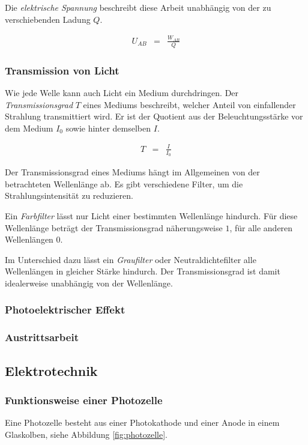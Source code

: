 \documentclass[12pt,a4paper]{scrartcl}
\numberwithin{equation}{section} %
\begin{document}
Die \emph{elektrische Spannung} beschreibt diese Arbeit unabhängig von der zu verschiebenden Ladung $Q$. \cite{Gerthsen}

\begin{eqnarray}
	U_{AB} &=& \frac{W_{AB}}{Q}
\end{eqnarray}

\subsubsection{Transmission von Licht}
Wie jede Welle kann auch Licht ein Medium durchdringen. Der \emph{Transmissionsgrad} $T$ eines Mediums beschreibt, welcher Anteil von einfallender Strahlung transmittiert wird. Er ist der Quotient aus der Beleuchtungsstärke vor dem Medium $I_0$ sowie hinter demselben $I$. \cite{Gerthsen}

\begin{eqnarray}
	T &=& \frac{I}{I_0}
\end{eqnarray}

\noindent
Der Transmissionsgrad eines Mediums hängt im Allgemeinen von der betrachteten Wellenlänge ab. Es gibt verschiedene Filter, um die Strahlungsintensität zu reduzieren.

Ein \emph{Farbfilter} lässt nur Licht einer bestimmten Wellenlänge hindurch. Für diese Wellenlänge beträgt der Transmissionsgrad näherungsweise $1$, für alle anderen Wellenlängen $0$. %

Im Unterschied dazu lässt ein \emph{Graufilter} oder Neutraldichtefilter alle Wellenlängen in gleicher Stärke hindurch. Der Transmissionsgrad ist damit idealerweise unabhängig von der Wellenlänge. %

\subsubsection{Photoelektrischer Effekt}
\subsubsection{Austrittsarbeit}

\subsection{Elektrotechnik}
\subsubsection{Funktionsweise einer Photozelle}
Eine Photozelle besteht aus einer Photokathode und einer Anode in einem Glaskolben, siehe Abbildung \ref{fig:photozelle}.
\end{document}
